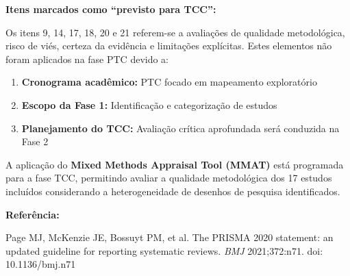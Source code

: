 \begin{apendicesenv}
\textbf{Itens marcados como ``previsto para TCC'':}

Os itens 9, 14, 17, 18, 20 e 21 referem-se a avaliações de qualidade metodológica, risco de viés, certeza da evidência e limitações explícitas. Estes elementos não foram aplicados na fase PTC devido a:

\begin{enumerate}
    \item \textbf{Cronograma acadêmico:} PTC focado em mapeamento exploratório
    \item \textbf{Escopo da Fase 1:} Identificação e categorização de estudos
    \item \textbf{Planejamento do TCC:} Avaliação crítica aprofundada será conduzida na Fase 2
\end{enumerate}

A aplicação do \textbf{Mixed Methods Appraisal Tool (MMAT)} \cite{MMAT2018} está programada para a fase TCC, permitindo avaliar a qualidade metodológica dos 17 estudos incluídos considerando a heterogeneidade de desenhos de pesquisa identificados.

\textbf{Referência:}

Page MJ, McKenzie JE, Bossuyt PM, et al. The PRISMA 2020 statement: an updated guideline for reporting systematic reviews. \textit{BMJ} 2021;372:n71. doi: 10.1136/bmj.n71

\end{apendicesenv}
